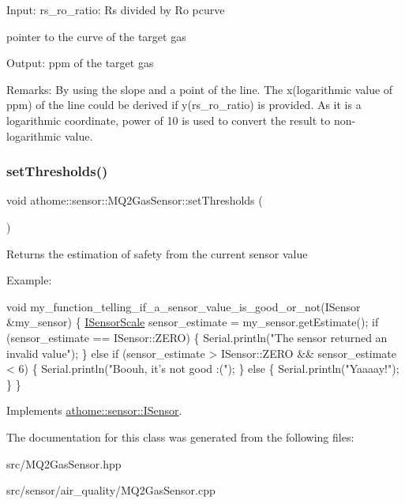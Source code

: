 Input\+: rs\+\_\+ro\+\_\+ratio\+: Rs divided by Ro pcurve

pointer to the curve of the target gas

Output\+: ppm of the target gas

Remarks\+: By using the slope and a point of the line. The x(logarithmic value of ppm) of the line could be derived if y(rs\+\_\+ro\+\_\+ratio) is provided. As it is a logarithmic coordinate, power of 10 is used to convert the result to non-\/logarithmic value. \mbox{\label{classathome_1_1sensor_1_1_m_q2_gas_sensor_a69de9f45b9babd2d111b4ce020d7c83e}} 
\subsubsection{\texorpdfstring{set\+Thresholds()}{setThresholds()}}
{\footnotesize\ttfamily void athome\+::sensor\+::\+M\+Q2\+Gas\+Sensor\+::set\+Thresholds (\begin{DoxyParamCaption}\item[{const \mbox{\hyperlink{structathome_1_1sensor_1_1_i_sensor_1_1_i_sensor_thresholds}{I\+Sensor\+Thresholds}} \&}]{ }\end{DoxyParamCaption})\hspace{0.3cm}{\ttfamily [virtual]}}

Returns the estimation of safety from the current sensor value

Example\+:


\begin{DoxyCode}
\textcolor{keywordtype}{void} my\_function\_telling\_if\_a\_sensor\_value\_is\_good\_or\_not(ISensor
&my\_sensor) \{ \mbox{\hyperlink{classathome_1_1sensor_1_1_i_sensor_aa70bc27a4c17c86caf96cca776541ddf}{ISensorScale}} sensor\_estimate = my\_sensor.getEstimate(); \textcolor{keywordflow}{if}
(sensor\_estimate == ISensor::ZERO) \{ Serial.println(\textcolor{stringliteral}{"The sensor returned an}
\textcolor{stringliteral}{invalid value"});
  \}
  \textcolor{keywordflow}{else} \textcolor{keywordflow}{if} (sensor\_estimate > ISensor::ZERO && sensor\_estimate < 6) \{
    Serial.println(\textcolor{stringliteral}{"Boouh, it's not good :("});
  \}
  \textcolor{keywordflow}{else} \{
    Serial.println(\textcolor{stringliteral}{"Yaaaay!"});
  \}
\}
\end{DoxyCode}
 

Implements \mbox{\hyperlink{classathome_1_1sensor_1_1_i_sensor_af86df8538fecfcfc670b4adfbbde6abb}{athome\+::sensor\+::\+I\+Sensor}}.



The documentation for this class was generated from the following files\+:\begin{DoxyCompactItemize}
\item 
src/M\+Q2\+Gas\+Sensor.\+hpp\item 
src/sensor/air\+\_\+quality/M\+Q2\+Gas\+Sensor.\+cpp\end{DoxyCompactItemize}
